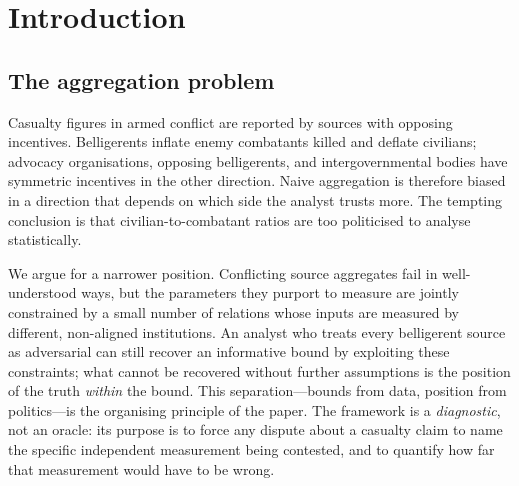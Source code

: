 \section{Introduction}

\subsection{The aggregation problem}

Casualty figures in armed conflict are reported by sources with opposing incentives. Belligerents inflate enemy combatants killed and deflate civilians; advocacy organisations, opposing belligerents, and intergovernmental bodies have symmetric incentives in the other direction. Naive aggregation is therefore biased in a direction that depends on which side the analyst trusts more. The tempting conclusion is that civilian-to-combatant ratios are too politicised to analyse statistically.

We argue for a narrower position. Conflicting source aggregates fail in well-understood ways, but the parameters they purport to measure are jointly constrained by a small number of relations whose inputs are measured by different, non-aligned institutions. An analyst who treats every belligerent source as adversarial can still recover an informative bound by exploiting these constraints; what cannot be recovered without further assumptions is the position of the truth \emph{within} the bound. This separation---bounds from data, position from politics---is the organising principle of the paper. The framework is a \emph{diagnostic}, not an oracle: its purpose is to force any dispute about a casualty claim to name the specific independent measurement being contested, and to quantify how far that measurement would have to be wrong.

